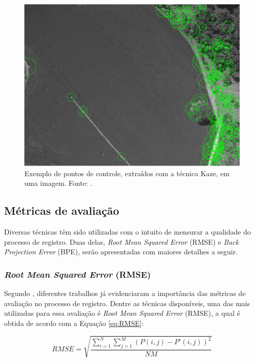 \documentclass[12pt]{article}
\begin{document}
\begin{figure}[!ht]
    \centering
    \includegraphics[width=0.5\textheight]{figures/exemplo02.png}
    \caption{Exemplo de pontos de controle, extraídos com a técnica Kaze, em uma imagem. Fonte: \cite{matlab01}.}
    \label{fig:kaze}
\end{figure}

\subsection{Métricas de avaliação}
\label{subsubsec:metricas}

Diversas técnicas têm sido utilizadas com o intuito de mensurar a qualidade do processo de registro. Duas delas, \textit{Root Mean Squared Error} (RMSE) e \textit{Back Projection Error} (BPE), serão apresentadas com maiores detalhes a seguir.

\subsubsection{\textit{Root Mean Squared Error} (RMSE)}

Segundo \cite{paula},  diferentes trabalhos já evidenciaram a importância das métricas de avaliação no processo de registro. Dentre as técnicas disponíveis, uma das mais utilizadas para essa avaliação é \textit{Root Mean Squared Error} (RMSE), a qual é obtida de acordo com a Equação \ref{eq:RMSE}:

\begin{equation}\label{eq:RMSE}
    RMSE = \sqrt{\frac{\sum_{i=1}^{N}\sum_{j=1}^{M}(P(i,j)-P'(i,j))^2}{NM}}
\end{equation}
\end{document}
